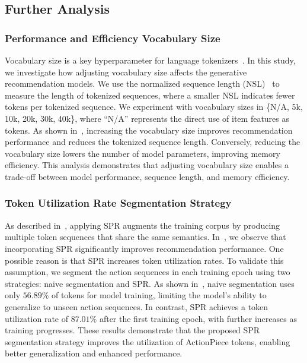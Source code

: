 \subsection{Further Analysis}


\subsubsection{Performance and Efficiency \wrt Vocabulary Size}

Vocabulary size is a key hyperparameter for language tokenizers~\cite{meta2024llama3,dagan2024getting}. In this study, we investigate how adjusting vocabulary size affects the generative recommendation models. We use the normalized sequence length (NSL)~\cite{dagan2024getting} to measure the length of tokenized sequences, where a smaller NSL indicates fewer tokens per tokenized sequence. We experiment with vocabulary sizes in \{N/A, 5k, 10k, 20k, 30k, 40k\}, where ``N/A'' represents the direct use of item features as tokens. As shown in~, increasing the vocabulary size improves recommendation performance and reduces the tokenized sequence length. Conversely, reducing the vocabulary size lowers the number of model parameters, improving memory efficiency. This analysis demonstrates that adjusting vocabulary size enables a trade-off between model performance, sequence length, and memory efficiency.

\subsubsection{Token Utilization Rate \wrt Segmentation Strategy}\label{sec:token_utilization}

As described in~, applying SPR augments the training corpus by producing multiple token sequences that share the same semantics. In~, we observe that incorporating SPR significantly improves recommendation performance. One possible reason is that SPR increases token utilization rates. To validate this assumption, we segment the action sequences in each training epoch using two strategies: naive segmentation and SPR. As shown in~, naive segmentation uses only $56.89\%$ of tokens for model training, limiting the model's ability to generalize to unseen action sequences. In contrast, SPR achieves a token utilization rate of $87.01\%$ after the first training epoch, with further increases as training progresses. These results demonstrate that the proposed SPR segmentation strategy improves the utilization of ActionPiece tokens, enabling better generalization and enhanced performance.


